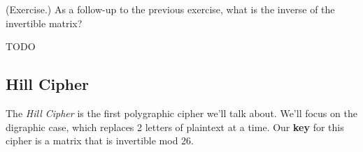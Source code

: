 \documentclass[letterpaper]{article}
\begin{document}
\begin{mdframed}
    (Exercise.) As a follow-up to the previous exercise, what is the inverse of the invertible matrix? 

    \begin{mdframed}
        TODO 
    \end{mdframed}
\end{mdframed}

\subsection{Hill Cipher}
The \emph{Hill Cipher} is the first polygraphic cipher we'll talk about. We'll focus on the digraphic case, which replaces 2 letters of plaintext at a time. Our \textbf{key} for this cipher is a matrix that is invertible mod 26. 
\end{document}
